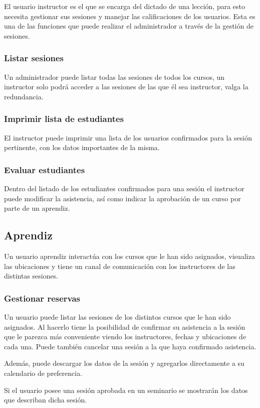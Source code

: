 		El usuario instructor es el que se encarga del dictado de una lección, para esto necesita gestionar sus sesiones y manejar las calificaciones de los usuarios. Esta es una de las funciones que puede realizar el administrador a través de la gestión de sesiones.

			\subsubsection{Listar sesiones}

			Un administrador puede listar todas las sesiones de todos los cursos, un instructor solo podrá acceder a las sesiones de las que él sea instructor, valga la redundancia.

			\subsubsection{Imprimir lista de estudiantes}

			El instructor puede imprimir una lista de los usuarios confirmados para la sesión pertinente, con los datos importantes de la misma. 

			\subsubsection{Evaluar estudiantes}

			Dentro del listado de los estudiantes confirmados para una sesión el instructor puede modificar la asistencia, así como indicar la aprobación de un curso por parte de un aprendiz.


		\subsection{Aprendiz} %
		\label{sub:aprendiz}
		
		Un usuario aprendiz interactúa con los cursos que le han sido asignados, visualiza las ubicaciones y tiene un canal de comunicación con los instructores de las distintas sesiones.

			\subsubsection{Gestionar reservas}
			Un usuario puede listar las sesiones de los distintos cursos que le han sido asignados. Al hacerlo tiene la posibilidad de confirmar su asistencia a la sesión que le parezca más conveniente viendo los instructores, fechas y ubicaciones de cada una. Puede también cancelar una sesión a la que haya confirmado asistencia.

			Además, puede descargar los datos de la sesión y agregarlos directamente a su calendario de preferencia.

			Si el usuario posee una sesión aprobada en un seminario se mostrarán los datos que describan dicha sesión.





